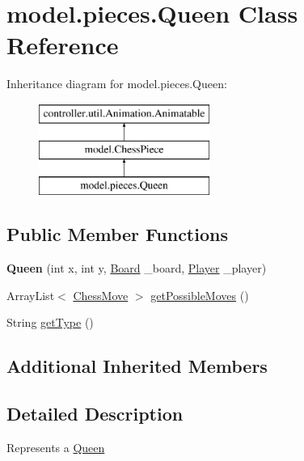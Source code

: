 \hypertarget{classmodel_1_1pieces_1_1_queen}{\section{model.\-pieces.\-Queen Class Reference}
\label{classmodel_1_1pieces_1_1_queen}
}
Inheritance diagram for model.\-pieces.\-Queen\-:\begin{figure}[H]
\begin{center}
\leavevmode
\includegraphics[height=3.000000cm]{classmodel_1_1pieces_1_1_queen}
\end{center}
\end{figure}
\subsection*{Public Member Functions}
\begin{DoxyCompactItemize}
\item 
\hypertarget{classmodel_1_1pieces_1_1_queen_abcce0858220fb4f9d47ee81a15f74adf}{{\bfseries Queen} (int x, int y, \hyperlink{classmodel_1_1board_1_1_board}{Board} \-\_\-board, \hyperlink{classcontroller_1_1_player}{Player} \-\_\-player)}\label{classmodel_1_1pieces_1_1_queen_abcce0858220fb4f9d47ee81a15f74adf}

\item 
Array\-List$<$ \hyperlink{classmodel_1_1_chess_move}{Chess\-Move} $>$ \hyperlink{classmodel_1_1pieces_1_1_queen_a94300f345153c441518363f4bef81f9c}{get\-Possible\-Moves} ()
\item 
String \hyperlink{classmodel_1_1pieces_1_1_queen_acf33a9937af8917615b2a53300830af2}{get\-Type} ()
\end{DoxyCompactItemize}
\subsection*{Additional Inherited Members}


\subsection{Detailed Description}
Represents a \hyperlink{classmodel_1_1pieces_1_1_queen}{Queen}

